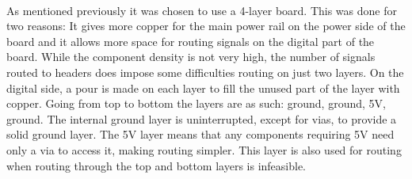 ~\\
As mentioned previously it was chosen to use a 4-layer board.
This was done for two reasons: It gives more copper for the main power rail on the power side of the board and it allows more space for routing signals on the digital part of the board.
While the component density is not very high, the number of signals routed to headers does impose some difficulties routing on just two layers.
On the digital side, a pour is made on each layer to fill the unused part of the layer with copper.
Going from top to bottom the layers are as such: ground, ground, 5V, ground.
The internal ground layer is uninterrupted, except for vias, to provide a solid ground layer.
The 5V layer means that any components requiring 5V need only a via to access it, making routing simpler.
This layer is also used for routing when routing through the top and bottom layers is infeasible.




